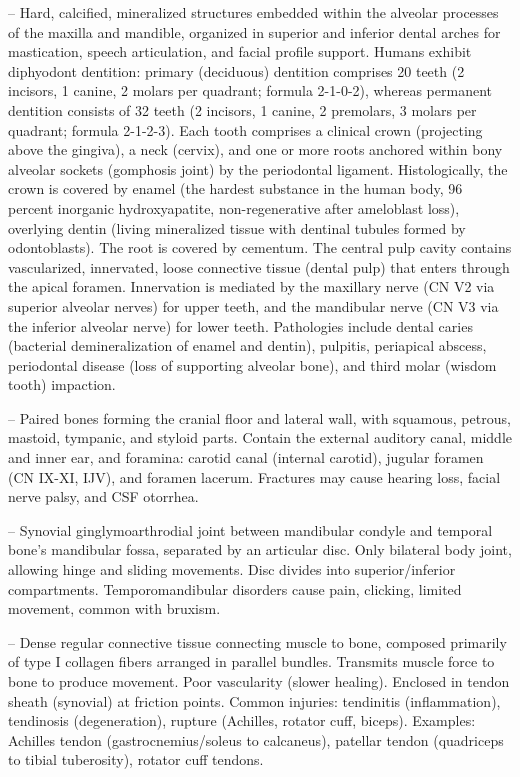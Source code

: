 -- Hard, calcified, mineralized structures embedded within the alveolar processes of the maxilla and mandible, organized in superior and inferior dental arches for mastication, speech articulation, and facial profile support. Humans exhibit diphyodont dentition: primary (deciduous) dentition comprises 20 teeth (2 incisors, 1 canine, 2 molars per quadrant; formula 2-1-0-2), whereas permanent dentition consists of 32 teeth (2 incisors, 1 canine, 2 premolars, 3 molars per quadrant; formula 2-1-2-3). Each tooth comprises a clinical crown (projecting above the gingiva), a neck (cervix), and one or more roots anchored within bony alveolar sockets (gomphosis joint) by the periodontal ligament. Histologically, the crown is covered by enamel (the hardest substance in the human body, 96 percent inorganic hydroxyapatite, non-regenerative after ameloblast loss), overlying dentin (living mineralized tissue with dentinal tubules formed by odontoblasts). The root is covered by cementum. The central pulp cavity contains vascularized, innervated, loose connective tissue (dental pulp) that enters through the apical foramen. Innervation is mediated by the maxillary nerve (CN V2 via superior alveolar nerves) for upper teeth, and the mandibular nerve (CN V3 via the inferior alveolar nerve) for lower teeth. Pathologies include dental caries (bacterial demineralization of enamel and dentin), pulpitis, periapical abscess, periodontal disease (loss of supporting alveolar bone), and third molar (wisdom tooth) impaction.

-- Paired bones forming the cranial floor and lateral wall, with squamous, petrous, mastoid, tympanic, and styloid parts. Contain the external auditory canal, middle and inner ear, and foramina: carotid canal (internal carotid), jugular foramen (CN IX-XI, IJV), and foramen lacerum. Fractures may cause hearing loss, facial nerve palsy, and CSF otorrhea.

-- Synovial ginglymoarthrodial joint between mandibular condyle and temporal bone's mandibular fossa, separated by an articular disc. Only bilateral body joint, allowing hinge and sliding movements. Disc divides into superior/inferior compartments. Temporomandibular disorders cause pain, clicking, limited movement, common with bruxism.

-- Dense regular connective tissue connecting muscle to bone, composed primarily of type I collagen fibers arranged in parallel bundles. Transmits muscle force to bone to produce movement. Poor vascularity (slower healing). Enclosed in tendon sheath (synovial) at friction points. Common injuries: tendinitis (inflammation), tendinosis (degeneration), rupture (Achilles, rotator cuff, biceps). Examples: Achilles tendon (gastrocnemius/soleus to calcaneus), patellar tendon (quadriceps to tibial tuberosity), rotator cuff tendons.

